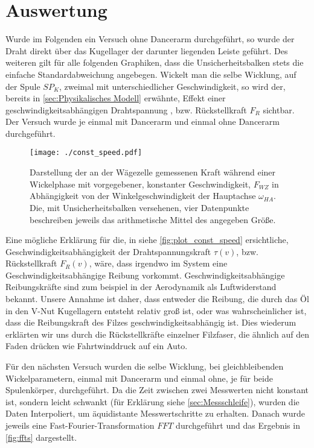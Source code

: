 \section{Auswertung}
\label{sec:Auswertung}

Wurde im Folgenden ein Versuch ohne Dancerarm durchgeführt, so wurde der Draht direkt über das Kugellager der darunter liegenden Leiste geführt. Des weiteren gilt für alle folgenden Graphiken, dass die Unsicherheitsbalken stets die einfache Standardabweichung angebegen.\newline
Wickelt man die selbe Wicklung, auf der Spule $SP_K$, zweimal mit unterschiedlicher Geschwindigkeit, so wird der, bereits in \autoref{sec:Physikalisches Modell} erwähnte, Effekt einer geschwindigkeitsabhängigen Drahtspannung , bzw. Rückstellkraft $F_R$ sichtbar. Der Versuch wurde je einmal mit Dancerarm und einmal ohne Dancerarm durchgeführt.

\begin{figure}[H]
    \centering
    \texttt{[image: ./const\_speed.pdf]}
    \caption{Darstellung der an der Wägezelle gemessenen Kraft während einer Wickelphase mit vorgegebener, konstanter Geschwindigkeit, $F_{WZ}$ in Abhängigkeit von der Winkelgeschwindigkeit der Hauptachse $\omega_{HA}$. Die, mit Unsicherheitsbalken versehenen, vier Datenpunkte beschreiben jeweils das arithmetische Mittel des angegeben Größe.}
    \label{fig:plot_const_speed}
\end{figure}


Eine mögliche Erklärung für die, in siehe \autoref{fig:plot_const_speed} ersichtliche, Geschwindigkeitsabhängigkeit der Drahtspannungskraft $\tau(v)$, bzw. Rückstellkraft $F_R(v)$, wäre, dass irgendwo im System eine Geschwindigkeitsabhängige Reibung vorkommt.
Geschwindigkeitsabhängige Reibungskräfte sind zum beispiel in der Aerodynamik als Luftwiderstand bekannt.
Unsere Annahme ist daher, dass entweder die Reibung, die durch das Öl in den V-Nut Kugellagern entsteht relativ groß ist, oder was wahrscheinlicher ist, dass die Reibungskraft des Filzes geschwindigkeitsabhängig ist.
Dies wiederum erklärten wir uns durch die Rückstellkräfte einzelner Filzfaser, die ähnlich auf den Faden drücken wie Fahrtwinddruck auf ein Auto.



Für den nächsten Versuch wurden die selbe Wicklung, bei gleichbleibenden Wickelparametern, einmal mit Dancerarm und einmal ohne, je für beide Spulenkörper, durchgeführt. Da die Zeit zwischen zwei Messwerten nicht konstant ist, sondern leicht schwankt (für Erklärung siehe \autoref{sec:Messschleife}), wurden die Daten Interpoliert, um äquidistante Messwertschritte zu erhalten. Danach wurde jeweils eine Fast-Fourier-Transformation $FFT$ durchgeführt und das Ergebnis in \autoref{fig:ffts} dargestellt.

